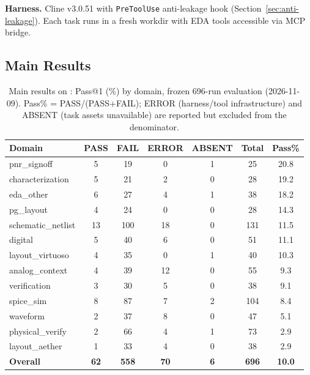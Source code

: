 \textbf{Harness.} Cline v3.0.51 with \texttt{PreToolUse} anti-leakage hook (Section~\ref{sec:anti-leakage}). Each task runs in a fresh workdir with EDA tools accessible via MCP bridge.

\subsection{Main Results}
\label{sec:main-results}

\begin{table}[ht]
\centering
\caption{Main results on \bench: Pass@1 (\%) by domain, frozen 696-run evaluation (2026-11-09). Pass\% = PASS/(PASS+FAIL); ERROR (harness/tool infrastructure) and ABSENT (task assets unavailable) are reported but excluded from the denominator.}
\label{tab:main-results}
\scriptsize
\setlength{\tabcolsep}{3pt}
\begin{tabular}{@{}lcccccc@{}}
\toprule
\textbf{Domain} & \textbf{PASS} & \textbf{FAIL} & \textbf{ERROR} & \textbf{ABSENT} & \textbf{Total} & \textbf{Pass\%} \\
\midrule
pnr\_signoff       & 5 & 19 & 0 & 1 & 25 & 20.8 \\
characterization   & 5 & 21 & 2 & 0 & 28 & 19.2 \\
eda\_other         & 6 & 27 & 4 & 1 & 38 & 18.2 \\
pg\_layout         & 4 & 24 & 0 & 0 & 28 & 14.3 \\
schematic\_netlist & 13 & 100 & 18 & 0 & 131 & 11.5 \\
digital            & 5 & 40 & 6 & 0 & 51 & 11.1 \\
layout\_virtuoso   & 4 & 35 & 0 & 1 & 40 & 10.3 \\
analog\_context    & 4 & 39 & 12 & 0 & 55 & 9.3 \\
verification       & 3 & 30 & 5 & 0 & 38 & 9.1 \\
spice\_sim         & 8 & 87 & 7 & 2 & 104 & 8.4 \\
waveform           & 2 & 37 & 8 & 0 & 47 & 5.1 \\
physical\_verify   & 2 & 66 & 4 & 1 & 73 & 2.9 \\
layout\_aether     & 1 & 33 & 4 & 0 & 38 & 2.9 \\
\midrule
\textbf{Overall}   & \textbf{62} & \textbf{558} & \textbf{70} & \textbf{6} & \textbf{696} & \textbf{10.0} \\
\bottomrule
\end{tabular}
\end{table}
